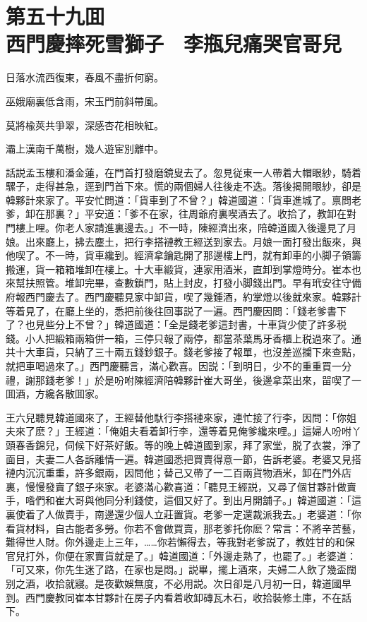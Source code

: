 
\chapter*{第五十九囬　\\西門慶摔死雪獅子　李瓶兒痛哭官哥兒}


\begin{myquote}
日落水流西復東，春風不盡折何窮。

巫娥廟裏低含雨，宋玉門前斜帶風。

莫將楡莢共爭翠，深感杏花相映紅。

灞上漢南千萬樹，幾人遊宦別離中。
\end{myquote}

話説孟玉樓和潘金蓮，在門首打發磨鏡叟去了。忽見従東一人帶着大帽眼紗，騎着騾子，走得甚急，逕到門首下來。慌的兩個婦人往後走不迭。落後揭開眼紗，卻是韓夥計來家了。平安忙問道：「貨車到了不曾？」韓道國道：「貨車進城了。禀問老爹，卸在那裏？」平安道：「爹不在家，往周爺府裏喫酒去了。收拾了，教卸在對門樓上哩。你老人家請進裏邊去。」不一時，陳經濟出來，陪韓道國入後邊見了月娘。出來廳上，拂去塵土，把行李搭褳教王經送到家去。月娘一面打發出飯來，與他喫了。不一時，貨車纔到。經濟拿鑰匙開了那邊樓上門，就有卸車的小脚子領籌搬運，貨一箱箱堆卸在樓上。十大車緞貨，連家用酒米，直卸到掌燈時分。崔本也來幫扶照管。堆卸完畢，查數鎖門，貼上封皮，打發小脚錢出門。早有玳安往守備府報西門慶去了。西門慶聽見家中卸貨，喫了幾鍾酒，約掌燈以後就來家。韓夥計等着見了，在廳上坐的，悉把前後往回事説了一遍。西門慶因問：「錢老爹書下了？也見些分上不曾？」韓道國道：「全是錢老爹這封書，十車貨少使了許多税錢。小人把緞箱兩箱併一箱，三停只報了兩停，都當茶葉馬牙香櫃上税過來了。通共十大車貨，只納了三十兩五錢鈔銀子。錢老爹接了報單，也沒差巡攔下來查點，就把車喝過來了。」西門慶聽言，滿心歡喜。因説：「到明日，少不的重重買一分禮，謝那錢老爹！」於是吩咐陳經濟陪韓夥計崔大哥坐，後邊拿菜出來，㽞喫了一囬酒，方纔各散囬家。

王六兒聽見韓道國來了，王經替他馱行李搭褳來家，連忙接了行李，因問：「你姐夫來了麽？」王經道：「俺姐夫看着卸行李，還等着見俺爹纔來哩。」這婦人吩咐丫頭春香錦兒，伺候下好茶好飯。等的晚上韓道國到家，拜了家堂，脱了衣裳，淨了面目，夫妻二人各訴離情一遍。韓道國悉把買賣得意一節，告訴老婆。老婆又見搭褳内沉沉重重，許多銀兩，因問他；替己又帶了一二百兩貨物酒米，卸在門外店裏，慢慢發賣了銀子來家。老婆滿心歡喜道：「聽見王經説，又尋了個甘夥計做賣手，喒們和崔大哥與他同分利錢使，這個又好了。到出月開舖子。」韓道國道：「這裏使着了人做賣手，南邊還少個人立莊置貨。老爹一定還裁派我去。」老婆道：「你看貨材料，自古能者多勞。你若不會做買賣，那老爹托你麽？常言：不將辛苦藝，難得世人財。你外邊走上三年，……你若懶得去，等我對老爹説了，教姓甘的和保官兒打外，你便在家賣貨就是了。」韓道國道：「外邊走熟了，也罷了。」老婆道：「可又來，你先生迷了路，在家也是悶。」説畢，擺上酒來，夫婦二人飲了幾盃闊别之酒，收拾就寢。是夜歡娛無度，不必用説。次日卻是八月初一日，韓道國早到。西門慶教同崔本甘夥計在房子内看着收卸磚瓦木石，收拾裝修土庫，不在話下。

